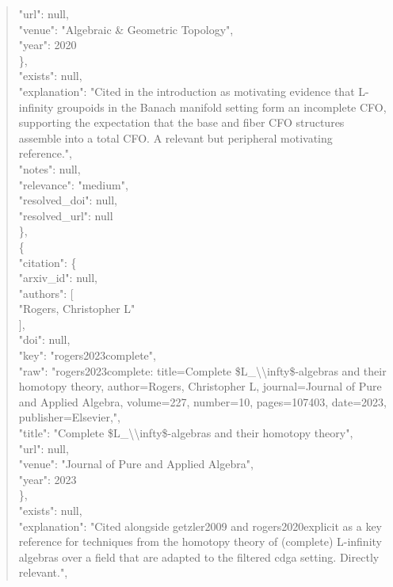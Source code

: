 \documentclass[11pt]{article}
\begin{document}
\begin{quote}
        "url": null,\\
        "venue": "Algebraic \& Geometric Topology",\\
        "year": 2020\\
      \},\\
      "exists": null,\\
      "explanation": "Cited in the introduction as motivating evidence that L-infinity groupoids in the Banach manifold setting form an incomplete CFO, supporting the expectation that the base and fiber CFO structures assemble into a total CFO. A relevant but peripheral motivating reference.",\\
      "notes": null,\\
      "relevance": "medium",\\
      "resolved\_doi": null,\\
      "resolved\_url": null\\
    \},\\
    \{\\
      "citation": \{\\
        "arxiv\_id": null,\\
        "authors": [\\
          "Rogers, Christopher L"\\
        ],\\
        "doi": null,\\
        "key": "rogers2023complete",\\
        "raw": "rogers2023complete: title=Complete \$L\_\textbackslash{}\textbackslash{}infty\$-algebras and their homotopy theory, author=Rogers, Christopher L, journal=Journal of Pure and Applied Algebra, volume=227, number=10, pages=107403, date=2023, publisher=Elsevier,",\\
        "title": "Complete \$L\_\textbackslash{}\textbackslash{}infty\$-algebras and their homotopy theory",\\
        "url": null,\\
        "venue": "Journal of Pure and Applied Algebra",\\
        "year": 2023\\
      \},\\
      "exists": null,\\
      "explanation": "Cited alongside getzler2009 and rogers2020explicit as a key reference for techniques from the homotopy theory of (complete) L-infinity algebras over a field that are adapted to the filtered cdga setting. Directly relevant.",\\

\end{quote}
\end{document}
